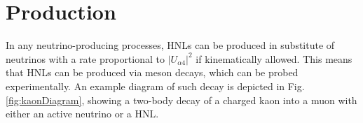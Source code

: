  
\section{Production}

In any neutrino-producing processes, HNLs can be produced in substitute of neutrinos with a rate proportional to $|U_{\alpha4}|^{2}$ if kinematically allowed. 
This means that HNLs can be produced via meson decays, which can be probed experimentally.
An example diagram of such decay is depicted in Fig. \ref{fig:kaonDiagram}, showing a two-body decay of a charged kaon into a muon with either an active neutrino or a HNL.

